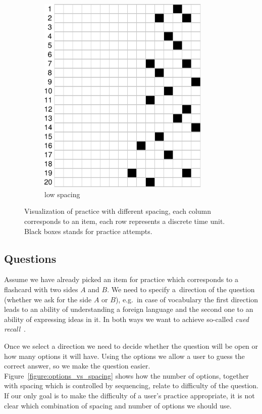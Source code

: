 \documentclass[table,color,cover,twoside,nolot,nolof]{fithesis3/fithesis3}
\begin{document}
\begin{figure}
\begin{subfigure}[b]{.5\textwidth}
		\includegraphics[width=0.9\textwidth]{figure/practice_progress_b}
		\caption{low spacing}
		\label{figure:practice_progress_b}
	\end{subfigure}
	\caption{Visualization of practice with different spacing, each column
		corresponds to an item, each row represents a discrete time unit. Black
		boxes stands for practice attempts.}
	\label{figure:practice_progress}
\end{figure}

\subsection{Questions}

Assume we have already picked an item for practice which corresponds to a
flashcard with two sides $A$ and $B$. We need to specify a~direction of the
question (whether we ask for the side $A$ or $B$), e.g.~in case of
vocabulary the first direction leads to an ability of understanding a foreign
language and the second one to an ability of expressing ideas in it. In both
ways we want to achieve so-called \emph{cued recall}~\cite{carpenter2006types}.

Once we select a direction we need to decide whether the question will be
open or how many options it will have. Using the options we allow a user
to guess the correct answer, so we make the question easier.
Figure~\ref{figure:options_vs_spacing} shows how the number of options,
together with spacing which is controlled by sequencing, relate to difficulty
of the question. If our only goal is to make the difficulty of a user's practice
appropriate, it is not clear which combination of spacing and number of options
we should use.
\end{document}
